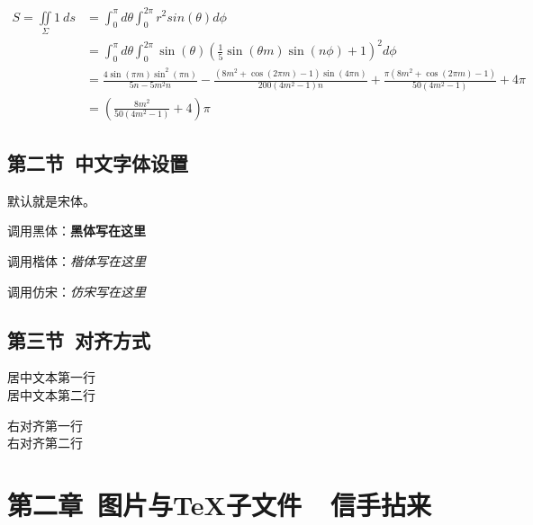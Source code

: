 \documentclass{ctexart}
\begin{document}
\begin{align*}
S=\iint\limits_{\Sigma}1 \ ds &= \int_0^{\pi}d\theta \int_0^{2\pi} r^2sin(\theta) d\phi \\
&= \int_0^{\pi}d\theta \int_0^{2\pi}\sin (\theta ) \left(\frac{1}{5} \sin (\theta  m) \sin (n \phi )+1\right)^2d\phi\\
&=\frac{4 \sin (\pi  m) \sin ^2(\pi  n)}{5 n-5 m^2 n}-\frac{\left(8 m^2+\cos (2 \pi  m)-1\right) \sin (4 \pi  n)}{200 \left(4 m^2-1\right) n}+\frac{\pi  \left(8 m^2+\cos (2 \pi  m)-1\right)}{50 \left(4 m^2-1\right)}+4 \pi\\
&=  \left(\frac{8 m^2}{50 \left(4 m^2-1\right)}+4\right)\pi
\end{align*}

\subsection{第二节\ 中文字体设置}

默认就是宋体。\par
调用黑体：\textbf{黑体写在这里}\par
调用楷体：\textit{楷体写在这里}\par
调用仿宋：\textsl{仿宋写在这里}\par

\subsection{第三节\ 对齐方式}


\begin{center} 
居中文本第一行\\
居中文本第二行\\
\end{center}

\begin{flushright}
右对齐第一行\\
右对齐第二行\\
\end{flushright}




\section{第二章\ 图片与TeX子文件\ \ 信手拈来}
\end{document}
